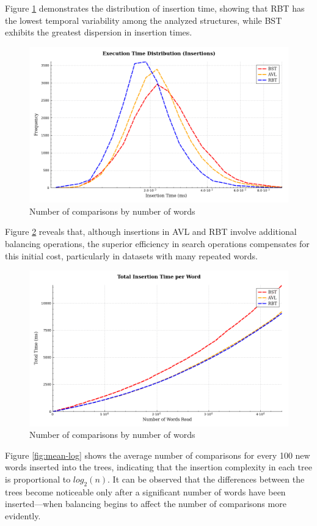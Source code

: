  Figure \ref{fig:timedist} demonstrates the distribution of insertion time,
 showing that RBT has the lowest temporal variability among the analyzed structures,
 while BST exhibits the greatest dispersion in insertion times.

 \begin{figure}[H]
     \centering
     \includegraphics[width=0.8\linewidth]{img/Graph_5_10103.pdf}
     \caption{Number of comparisons by number of words}
     \label{fig:timedist}
 \end{figure}

 Figure \ref{fig:cumulativedist} reveals that, although insertions in AVL and RBT
 involve additional balancing operations, the superior efficiency in search operations
 compensates for this initial cost, particularly in datasets with many repeated words.

 \begin{figure}[H]
     \centering
     \includegraphics[width=0.8\linewidth]{img/Graph_4_10103.pdf}
     \caption{Number of comparisons by number of words}
     \label{fig:cumulativedist}
 \end{figure}
Figure \ref{fig:mean-log} shows the average number of comparisons for every 100 new words inserted into the trees, indicating that the insertion complexity in each tree is proportional to $log_2(n)$. It can be observed that the differences between the trees become noticeable only after a significant number of words have been inserted—when balancing begins to affect the number of comparisons more evidently.

